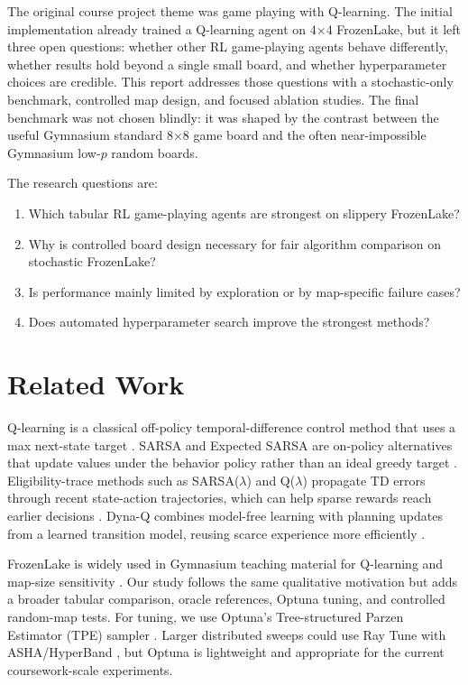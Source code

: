 \documentclass[10pt]{article}
\begin{document}
The original course project theme was game playing with Q-learning. The initial implementation already trained a Q-learning agent on 4$\times$4 FrozenLake, but it left three open questions: whether other RL game-playing agents behave differently, whether results hold beyond a single small board, and whether hyperparameter choices are credible. This report addresses those questions with a stochastic-only benchmark, controlled map design, and focused ablation studies. The final benchmark was not chosen blindly: it was shaped by the contrast between the useful Gymnasium standard 8$\times$8 game board and the often near-impossible Gymnasium low-$p$ random boards.

The research questions are:
\begin{enumerate}
    \item Which tabular RL game-playing agents are strongest on slippery FrozenLake?
    \item Why is controlled board design necessary for fair algorithm comparison on stochastic FrozenLake?
    \item Is performance mainly limited by exploration or by map-specific failure cases?
    \item Does automated hyperparameter search improve the strongest methods?
\end{enumerate}

\section{Related Work}
Q-learning is a classical off-policy temporal-difference control method that uses a max next-state target \cite{watkins1992q}. SARSA and Expected SARSA are on-policy alternatives that update values under the behavior policy rather than an ideal greedy target \cite{SuttonBarto2018}. Eligibility-trace methods such as SARSA($\lambda$) and Q($\lambda$) propagate TD errors through recent state-action trajectories, which can help sparse rewards reach earlier decisions \cite{SuttonBarto2018}. Dyna-Q combines model-free learning with planning updates from a learned transition model, reusing scarce experience more efficiently \cite{SuttonBarto2018}.

FrozenLake is widely used in Gymnasium teaching material for Q-learning and map-size sensitivity \cite{GymnasiumFrozenLakeTutorial}. Our study follows the same qualitative motivation but adds a broader tabular comparison, oracle references, Optuna tuning, and controlled random-map tests. For tuning, we use Optuna's Tree-structured Parzen Estimator (TPE) sampler \cite{OptunaTPESampler}. Larger distributed sweeps could use Ray Tune with ASHA/HyperBand \cite{RayTuneSchedulers}, but Optuna is lightweight and appropriate for the current coursework-scale experiments.
\end{document}
